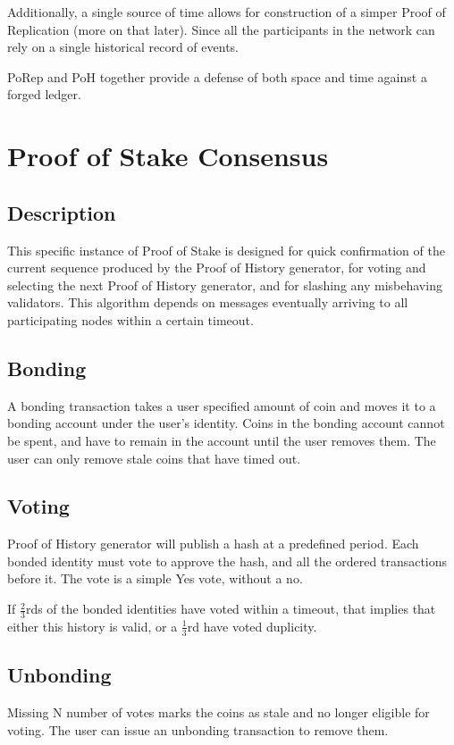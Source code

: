 \documentclass[12pt]{article}
\begin{document}
Additionally, a single source of time allows for construction of a simper Proof of Replication (more on that later).  Since all the participants in the network can rely on a single historical record of events.  

PoRep and PoH together provide a defense of both space and time against a forged ledger.

\section{Proof of Stake Consensus}
\subsection{Description}
This specific instance of Proof of Stake is designed for quick confirmation of the current sequence produced by the Proof of History generator, for voting and selecting the next Proof of History generator, and for slashing any misbehaving validators.  This algorithm depends on messages eventually arriving to all participating nodes within a certain timeout.
\subsection{Bonding}
A bonding transaction takes a user specified amount of coin and moves it to a bonding account under the user’s identity.  Coins in the bonding account cannot be spent, and have to remain in the account until the user removes them.  The user can only remove stale coins that have timed out. 
\subsection{Voting}
Proof of History generator will publish a hash at a predefined period.  Each bonded identity must vote to approve the hash, and all the ordered transactions before it.  The vote is a simple Yes vote, without a no.

If \(\frac{2}{3}\)rds of the bonded identities have voted within a timeout, that implies that either this history is valid, or a \(\frac{1}{3}\)rd have voted duplicity.

\subsection{Unbonding}

Missing N number of votes marks the coins as stale and no longer eligible for voting.  The user can issue an unbonding transaction to remove them.
\end{document}
